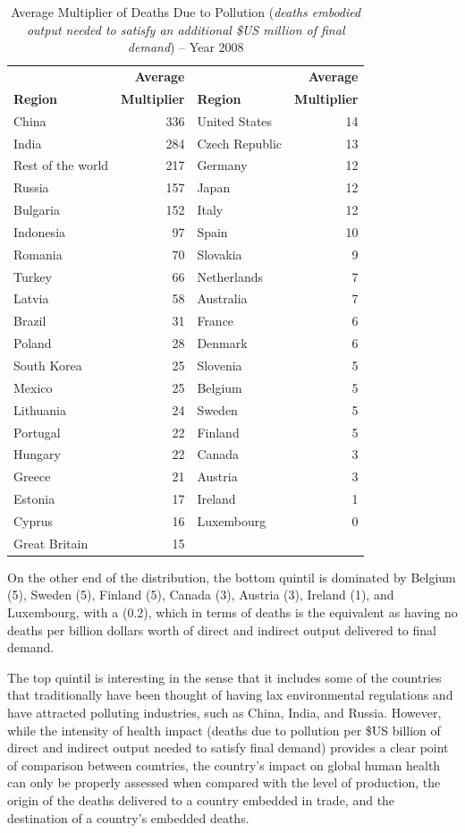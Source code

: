 \documentclass[a4paper,12pt]{article}
\begin{document}
\begin{table} [!hbtp] 
\caption{Average Multiplier of Deaths Due to Pollution (\textit{deaths embodied output needed to satisfy an additional \$US million of final demand}) -- Year 2008} 
\begin{center}
\small \begin{tabular}{lrlr}
 & \textbf{Average} &  & \textbf{Average} \\ 
\textbf{Region} & \textbf{Multiplier}& \textbf{Region} & \textbf{Multiplier}\\ 
\hline
China & 336 & United States & 14\\ 
India & 284 & Czech Republic & 13\\ 
Rest of the world & 217 & Germany & 12\\ 
Russia & 157 & Japan & 12\\ 
Bulgaria & 152 & Italy & 12\\ 
Indonesia & 97 & Spain & 10\\ 
Romania & 70 & Slovakia & 9\\ 
Turkey & 66 & Netherlands & 7\\ 
Latvia & 58 & Australia & 7\\ 
Brazil & 31 & France & 6\\ 
Poland & 28 & Denmark & 6\\ 
South Korea & 25 & Slovenia & 5\\ 
Mexico & 25 & Belgium & 5\\ 
Lithuania & 24 & Sweden & 5\\ 
Portugal & 22 & Finland & 5\\ 
Hungary & 22 & Canada & 3\\ 
Greece & 21 & Austria & 3\\ 
Estonia & 17 & Ireland & 1\\ 
Cyprus & 16 & Luxembourg & 0\\ 
Great Britain & 15 &  &  \\
\hline
\end{tabular}
\label{tab04} 
\end{center}
\end{table}

On the other end of the distribution, the bottom quintil is dominated by Belgium (5), Sweden (5), Finland (5), Canada (3), Austria (3), Ireland (1), and Luxembourg, with a (0.2), which in terms of deaths is the equivalent as having no deaths per billion dollars worth of direct and indirect output delivered to final demand.

The top quintil is interesting in the sense that it includes some of the countries that traditionally have been thought of having lax environmental regulations and have attracted polluting industries, such as China, India, and Russia. However, while the intensity of health impact (deaths due to pollution per \$US billion of direct and indirect output needed to satisfy final demand) provides a clear point of comparison between countries, the country's impact on global human health can only be properly assessed when compared with the level of production, the origin of the deaths delivered to a country embedded in trade, and the destination of a country's embedded deaths.
\end{document}
